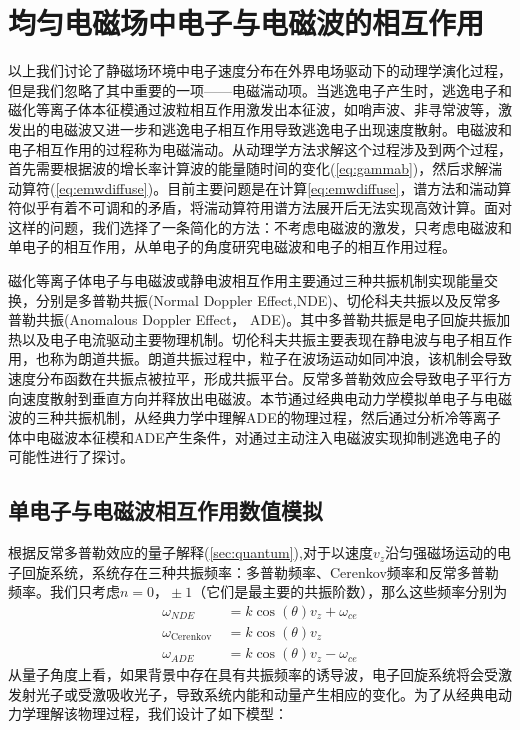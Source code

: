 \section{均匀电磁场中电子与电磁波的相互作用}\label{sec:ewmele}
以上我们讨论了静磁场环境中电子速度分布在外界电场驱动下的动理学演化过程，但是我们忽略了其中重要的一项——电磁湍动项。当逃逸电子产生时，逃逸电子和磁化等离子体本征模通过波粒相互作用激发出本征波，如哨声波、非寻常波等，激发出的电磁波又进一步和逃逸电子相互作用导致逃逸电子出现速度散射。电磁波和电子相互作用的过程称为电磁湍动\cite{胡希伟2006等离子体理论基础}。从动理学方法求解这个过程涉及到两个过程，首先需要根据波的增长率计算波的能量随时间的变化(\autoref{eq:gammab})，然后求解湍动算符(\autoref{eq:emwdiffuse})。目前主要问题是在计算\autoref{eq:emwdiffuse}，谱方法和湍动算符似乎有着不可调和的矛盾，将湍动算符用谱方法展开后无法实现高效计算。面对这样的问题，我们选择了一条简化的方法：不考虑电磁波的激发，只考虑电磁波和单电子的相互作用，从单电子的角度研究电磁波和电子的相互作用过程。
\par 磁化等离子体电子与电磁波或静电波相互作用主要通过三种共振机制实现能量交换，分别是多普勒共振(Normal Doppler Effect,NDE)、切伦科夫共振以及反常多普勒共振(Anomalous Doppler Effect， ADE)。其中多普勒共振是电子回旋共振加热以及电子电流驱动主要物理机制。切伦科夫共振主要表现在静电波与电子相互作用，也称为朗道共振。朗道共振过程中，粒子在波场运动如同冲浪，该机制会导致速度分布函数在共振点被拉平，形成共振平台\cite{RN1801}。反常多普勒效应会导致电子平行方向速度散射到垂直方向并释放出电磁波。本节通过经典电动力学模拟单电子与电磁波的三种共振机制，从经典力学中理解ADE的物理过程，然后通过分析冷等离子体中电磁波本征模和ADE产生条件，对通过主动注入电磁波实现抑制逃逸电子的可能性进行了探讨。
\subsection{单电子与电磁波相互作用数值模拟}\label{sec:simulationVPA}
根据反常多普勒效应的量子解释(\autoref{sec:quantum}),对于以速度$v_z$沿匀强磁场运动的电子回旋系统，系统存在三种共振频率：多普勒频率、Cerenkov频率和反常多普勒频率。我们只考虑$n=0\text{，}±1$（它们是最主要的共振阶数），那么这些频率分别为
\begin{equation}\label{eq:resonant}
\begin{aligned}\omega_{N D E} & = k \cos (\theta) v_{z}+\omega_{c e} \\\omega_{\text {Cerenkov }} & = k \cos (\theta) v_{z} \\\omega_{A D E} & = k \cos (\theta) v_{z}-\omega_{c e}\end{aligned}
\end{equation}
从量子角度上看，如果背景中存在具有共振频率的诱导波，电子回旋系统将会受激发射光子或受激吸收光子，导致系统内能和动量产生相应的变化。为了从经典电动力学理解该物理过程，我们设计了如下模型：


